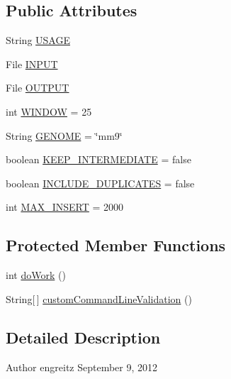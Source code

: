 \subsection*{Public Attributes}
\begin{DoxyCompactItemize}
\item 
String \hyperlink{classbroad_1_1pda_1_1samtools_1_1_paired_end_t_d_f_a21ab21c18e8c1f0fafc1f67da4c595d3}{U\+S\+A\+G\+E}
\item 
File \hyperlink{classbroad_1_1pda_1_1samtools_1_1_paired_end_t_d_f_ab11151a3035cc606f914973ba04c1a1f}{I\+N\+P\+U\+T}
\item 
File \hyperlink{classbroad_1_1pda_1_1samtools_1_1_paired_end_t_d_f_af7c1ad02505f29c7791bced896b8ff53}{O\+U\+T\+P\+U\+T}
\item 
int \hyperlink{classbroad_1_1pda_1_1samtools_1_1_paired_end_t_d_f_a45564a0767ae3d8dd6706b9b093b980d}{W\+I\+N\+D\+O\+W} = 25
\item 
String \hyperlink{classbroad_1_1pda_1_1samtools_1_1_paired_end_t_d_f_a6512b89abaa0a824d76c6eb7308790f3}{G\+E\+N\+O\+M\+E} = \char`\"{}mm9\char`\"{}
\item 
boolean \hyperlink{classbroad_1_1pda_1_1samtools_1_1_paired_end_t_d_f_af722023376f01b5ae9ebe789a7a5b91d}{K\+E\+E\+P\+\_\+\+I\+N\+T\+E\+R\+M\+E\+D\+I\+A\+T\+E} = false
\item 
boolean \hyperlink{classbroad_1_1pda_1_1samtools_1_1_paired_end_t_d_f_a4b7e46dd1f9df8d30c181b4205ae6ffe}{I\+N\+C\+L\+U\+D\+E\+\_\+\+D\+U\+P\+L\+I\+C\+A\+T\+E\+S} = false
\item 
int \hyperlink{classbroad_1_1pda_1_1samtools_1_1_paired_end_t_d_f_a48965ba149fb2e93289130924409a4bd}{M\+A\+X\+\_\+\+I\+N\+S\+E\+R\+T} = 2000
\end{DoxyCompactItemize}
\subsection*{Protected Member Functions}
\begin{DoxyCompactItemize}
\item 
int \hyperlink{classbroad_1_1pda_1_1samtools_1_1_paired_end_t_d_f_aa954f908ae90ce096e0c7e9f05db8f2c}{do\+Work} ()
\item 
String\mbox{[}$\,$\mbox{]} \hyperlink{classbroad_1_1pda_1_1samtools_1_1_paired_end_t_d_f_a02a6d35622f6b076ea3510fbd325bb3e}{custom\+Command\+Line\+Validation} ()
\end{DoxyCompactItemize}


\subsection{Detailed Description}
\begin{DoxyAuthor}{Author}
engreitz September 9, 2012 
\end{DoxyAuthor}



